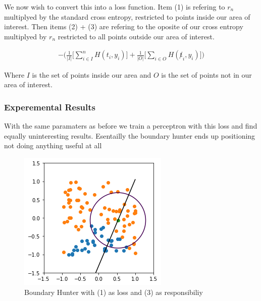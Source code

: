 \documentclass{article}
\begin{document}
We now wish to convert this into a loss function. Item (1) is refering to $r_n$ multiplyed by the standard cross entropy, restricted to points inside our area of interest. Then items (2) + (3) are refering to the oposite of our cross entropy multiplyed by $r_n$ restricted to all points outside our area of interest.

\begin{align}
- \big( \frac{1}{|I|} \big[ \sum_{i \in I}^n H(t_i, y_i) \big] + \frac{1}{|O|} \big[ \sum_{i \in O} H(\not t_i, y_i) \big] \big)
\end{align}

Where $I$ is the set of points inside our area and $O$ is the set of points not in our area of interest.

\subsubsection{Experemental Results}

With the same paramaters as before we train a perceptron with this loss and find equally uninteresting results. Esentailly the boundary hunter ends up positioning not doing anything useful at all

\begin{figure}[H]
\centering
  \begin{minipage}[b]{0.4\textwidth}
    \includegraphics[width=\textwidth]{BoundaryHunter-Attempt2-01.png}
    \caption{Boundary Hunter with (1) as loss and (3) as responsibiliy}
  \end{minipage}
  \hfill
\end{figure}
\end{document}

